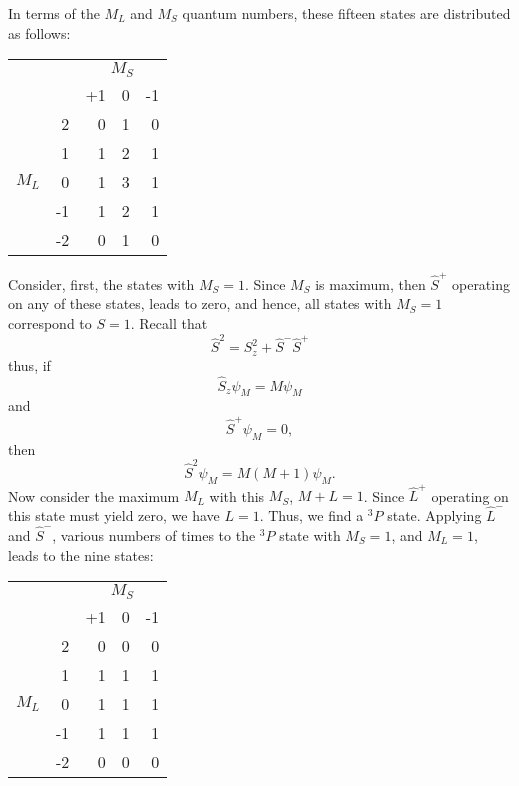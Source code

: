 In terms of the $M_L$ and $M_S$ quantum numbers, these fifteen states 
are distributed as follows:
\begin{center}
\begin{tabular}{rrrrr}\\
&&\multicolumn{3}{c}{$M_S$} \\ 
&&+1 & 0 & -1 \\ \cline{3-5}
& 2 & 0 & 1 & 0 \\
& 1 & 1 & 2 & 1 \\
$M_L$ & 0 & 1 & 3 & 1 \\
& -1 & 1 & 2 & 1 \\
& -2 & 0 & 1 & 0 \\\cline{3-5}
\end{tabular}
\end{center}
Consider, first, the states with $M_S = 1$.  Since $M_S$ is maximum, 
then ${\hat S}^+$ operating on any of these states, leads to zero, and 
hence, all states with $M_S = 1$ correspond to $S = 1$.  Recall that
\begin{equation}
{\hat S}^2 = S^2_z + {\hat S}^- {\hat S}^+
\end{equation}
thus, if
\begin{equation}
{\hat S}_z \psi_M = M \psi_M
\end{equation}
and
\begin{equation}
{\hat S}^+ \psi_M = 0 ,
\end{equation}
then
\begin{equation}
{\hat S}^2 \psi_M = M ( M + 1 ) \psi_M .
\end{equation}
Now consider the maximum $M_L$ with this $M_S$, $M + L = 1$.  Since 
${\hat L}^+$ operating on this state must yield zero, we have $L = 
1$.  Thus, we find a ${^3P}$ state.  Applying ${\hat L}^-$ and ${\hat 
S}^-$, various numbers of times to the ${^3P}$ state with $M_S = 1$, 
and $M_L = 1$, leads to the nine states:
\begin{center}
\begin{tabular}{rrrrr}\\
&&\multicolumn{3}{c}{$M_S$} \\ 
&&+1 & 0 & -1 \\ \cline{3-5}
& 2 & 0 & 0 & 0 \\
& 1 & 1 & 1 & 1 \\
$M_L$ & 0 & 1 & 1 & 1 \\
& -1 & 1 & 1 & 1 \\
& -2 & 0 & 0 & 0 \\\cline{3-5}
\end{tabular}
\end{center}
